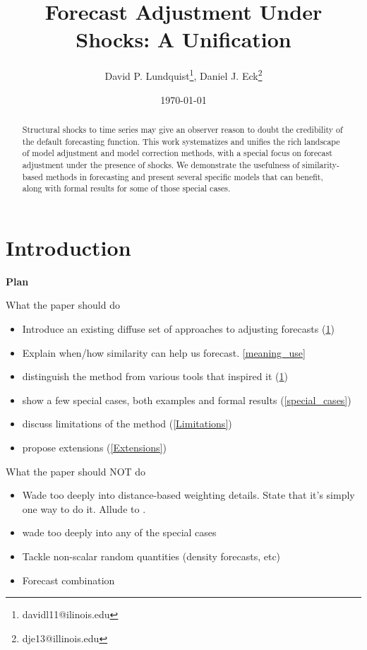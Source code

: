 \documentclass[11pt]{article}
\title{Forecast Adjustment Under Shocks: A Unification}
\author{David P. Lundquist\thanks{davidl11@ilinois.edu}, Daniel J. Eck\thanks{dje13@illinois.edu} }
\affil{Department of Statistics, University of Illinois at Urbana-Champaign}
\date{\today}
\theoremstyle{definition}
\begin{document}
\maketitle

\begin{abstract} 
Structural shocks to time series may give an observer reason to doubt the credibility of the default forecasting function.  This work systematizes and unifies the rich landscape of model adjustment and model correction methods, with a special focus on forecast adjustment under the presence of shocks.  We demonstrate the usefulness of similarity-based methods in forecasting and present several specific models that can benefit, along with formal results for some of those special cases.

\end{abstract}





\section{Introduction}\label{Introduction}

\textbf{Plan}

What the paper should do
\begin{itemize}
  \item Introduce an existing diffuse set of approaches to adjusting forecasts (\ref{Introduction})
  \item Explain when/how similarity can help us forecast. \ref{meaning_use}
  \item distinguish the method from various tools that inspired it (\ref{Introduction})
  \item show a few special cases, both examples and formal results (\ref{special_cases})
  \item discuss limitations of the method (\ref{Limitations})
  \item propose extensions (\ref{Extensions})
\end{itemize}

What the paper should NOT do

\begin{itemize}
  \item Wade too deeply into distance-based weighting details.  State that it's simply one way to do it.  Allude to \cite{lin2021minimizing,lundquist2024volatility}.
  \item wade too deeply into any of the special cases
  \item Tackle non-scalar random quantities (density forecasts, etc)
  \item Forecast combination

\end{itemize}
\end{document}
